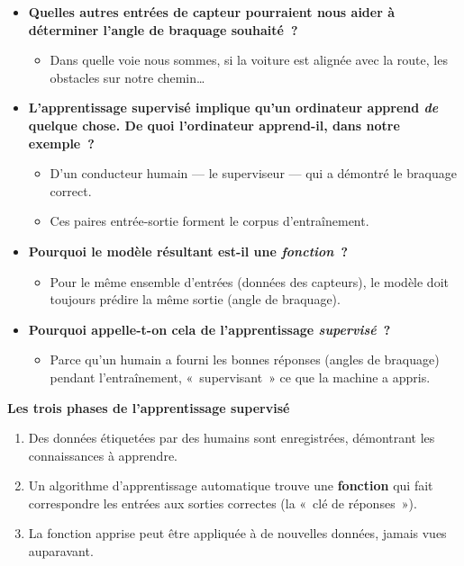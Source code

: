 \documentclass[12pt,a4paper]{article}
\begin{document}
\begin{thinkbox}
  \begin{itemize}
    \item \textbf{Quelles autres entrées de capteur pourraient nous aider à déterminer l'angle de braquage souhaité~?}
    \begin{itemize}
      \item Dans quelle voie nous sommes, si la voiture est alignée avec la route, les obstacles sur notre chemin…
    \end{itemize}
    \item \textbf{L'apprentissage supervisé implique qu'un ordinateur apprend \emph{de} quelque chose. De quoi l'ordinateur apprend-il, dans notre exemple~?}
    \begin{itemize}
      \item D'un conducteur humain — le superviseur — qui a démontré le braquage correct.
      \item Ces paires entrée-sortie forment le corpus d'entraînement.
    \end{itemize}
    \item \textbf{Pourquoi le modèle résultant est-il une \emph{fonction}~?}
    \begin{itemize}
      \item Pour le même ensemble d'entrées (données des capteurs), le modèle doit toujours prédire la même sortie (angle de braquage).
    \end{itemize}
    \item \textbf{Pourquoi appelle-t-on cela de l'apprentissage \emph{supervisé}~?}
    \begin{itemize}
      \item Parce qu'un humain a fourni les bonnes réponses (angles de braquage) pendant l'entraînement, «~supervisant~» ce que la machine a appris.
    \end{itemize}
  \end{itemize}
\end{thinkbox}

\begin{keypointbox}
  \textbf{Les trois phases de l'apprentissage supervisé}
  \begin{enumerate}
    \item Des données étiquetées par des humains sont enregistrées, démontrant les connaissances à apprendre.
    \item Un algorithme d'apprentissage automatique trouve une \textbf{fonction} qui fait correspondre les entrées aux sorties correctes (la «~clé de réponses~»).
    \item La fonction apprise peut être appliquée à de nouvelles données, jamais vues auparavant.
  \end{enumerate}
\end{keypointbox}
\end{document}
